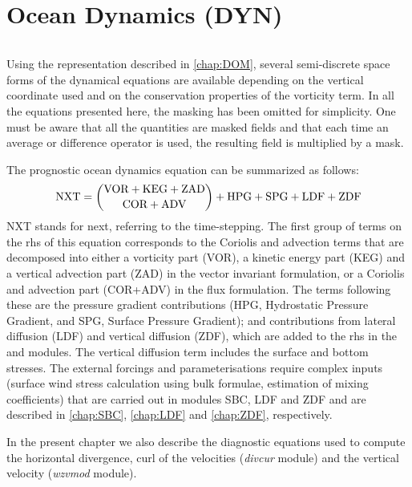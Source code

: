 \documentclass[../tex_main/NEMO_manual]{subfiles}
\begin{document}
\chapter{Ocean Dynamics (DYN)}
\label{chap:DYN}
\minitoc

$\ $\newline      %

Using the representation described in \autoref{chap:DOM}, several semi-discrete 
space forms of the dynamical equations are available depending on the vertical 
coordinate used and on the conservation properties of the vorticity term. In all 
the equations presented here, the masking has been omitted for simplicity. 
One must be aware that all the quantities are masked fields and that each time an
average or difference operator is used, the resulting field is multiplied by a mask.

The prognostic ocean dynamics equation can be summarized as follows:
\begin{equation*}
\text{NXT} = \dbinom	{\text{VOR} + \text{KEG} + \text {ZAD} }
						{\text{COR} + \text{ADV}                       }
			+ \text{HPG} + \text{SPG} + \text{LDF} + \text{ZDF}
\end{equation*}
NXT stands for next, referring to the time-stepping. The first group of terms on 
the rhs of this equation corresponds to the Coriolis and advection 
terms that are decomposed into either a vorticity part (VOR), a kinetic energy part (KEG) 
and a vertical advection part (ZAD) in the vector invariant formulation, or a Coriolis 
and advection part (COR+ADV) in the flux formulation. The terms following these 
are the pressure gradient contributions (HPG, Hydrostatic Pressure Gradient, 
and SPG, Surface Pressure Gradient); and contributions from lateral diffusion 
(LDF) and vertical diffusion (ZDF), which are added to the rhs in the  
and  modules. The vertical diffusion term includes the surface and 
bottom stresses. The external forcings and parameterisations require complex 
inputs (surface wind stress calculation using bulk formulae, estimation of mixing 
coefficients) that are carried out in modules SBC, LDF and ZDF and are described 
in \autoref{chap:SBC}, \autoref{chap:LDF} and \autoref{chap:ZDF}, respectively. 

In the present chapter we also describe the diagnostic equations used to compute 
the horizontal divergence, curl of the velocities (\emph{divcur} module) and 
the vertical velocity (\emph{wzvmod} module).
\end{document}
